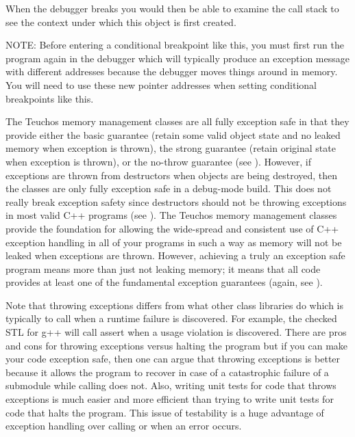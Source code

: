 \documentclass[pdf,ps2pdf,11pt]{SANDreport}
\begin{document}
When the debugger breaks you would then be able to examine the call
stack to see the context under which this {} object is
first created.

NOTE: Before entering a conditional breakpoint like this, you must
first run the program again in the debugger which will typically
produce an exception message with different addresses because the
debugger moves things around in memory.  You will need to use these
new pointer addresses when setting conditional breakpoints like this.

The Teuchos memory management classes are all fully exception safe in
that they provide either the basic guarantee (retain some valid object
state and no leaked memory when exception is thrown), the strong
guarantee (retain original state when exception is thrown), or the
no-throw guarantee (see {}\cite[Item 71]{C++CodingStandards05}).
However, if exceptions are thrown from destructors when objects are
being destroyed, then the classes are only fully exception safe in a
debug-mode build.  This does not really break exception safety since
destructors should not be throwing exceptions in most valid C++
programs (see {}\cite[Item 51]{C++CodingStandards05}).  The Teuchos
memory management classes provide the foundation for allowing the
wide-spread and consistent use of C++ exception handling in all of
your programs in such a way as memory will not be leaked when
exceptions are thrown.  However, achieving a truly an exception safe
program means more than just not leaking memory; it means that all
code provides at least one of the fundamental exception guarantees
(again, see {}\cite[Item 71]{C++CodingStandards05}).

Note that throwing exceptions differs from what other class libraries
do which is typically to call {} when a runtime
failure is discovered.  For example, the checked STL for g++ will call
assert when a usage violation is discovered.  There are pros and cons
for throwing exceptions versus halting the program but if you can make
your code exception safe, then one can argue that throwing exceptions
is better because it allows the program to recover in case of a
catastrophic failure of a submodule while calling
{} does not.  Also, writing unit tests for code
that throws exceptions is much easier and more efficient than trying
to write unit tests for code that halts the program.  This issue of
testability is a huge advantage of exception handling over calling
{} or {} when an error occurs.
\end{document}
